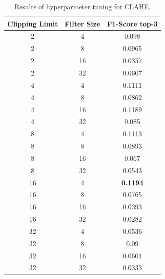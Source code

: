 \begin{table}
    \caption{Results of hyperparmeter tuning for CLAHE.}
    \label{tab:clahe_hp}
    \centering
    \small
    \tabcolsep=0.11cm
    \begin{tabular}{|cc|c|}
    \hline
        Clipping Limit & Filter Size & F1-Score top-3 \\ \hline
        2 & 4 & 0.098 \\ 
        2 & 8 & 0.0965 \\ 
        2 & 16 & 0.0357 \\ 
        2 & 32 & 0.0607 \\ 
        4 & 4 & 0.1111 \\ 
        4 & 8 & 0.0862 \\ 
        4 & 16 & 0.1189 \\ 
        4 & 32 & 0.085 \\ 
        8 & 4 & 0.1113 \\ 
        8 & 8 & 0.0893 \\ 
        8 & 16 & 0.067 \\ 
        8 & 32 & 0.0543 \\
        16 & 4 & \textbf{0.1194} \\ 
        16 & 8 & 0.0765 \\ 
        16 & 16 & 0.0393 \\ 
        16 & 32 & 0.0282 \\ 
        32 & 4 & 0.0536 \\ 
        32 & 8 & 0.09 \\ 
        32 & 16 & 0.0601 \\ 
        32 & 32 & 0.0333 \\ 
    \hline
    \end{tabular}

\end{table}


